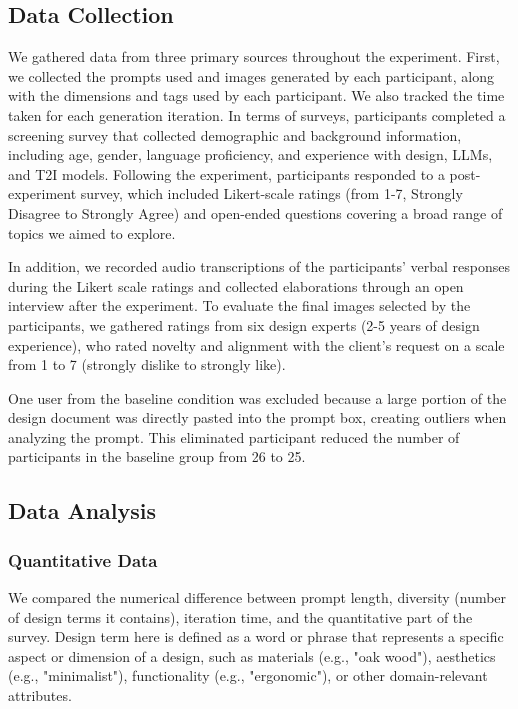\subsection{Data Collection}
We gathered data from three primary sources throughout the experiment. First, we collected the prompts used and images generated by each participant, along with the dimensions and tags used by each \toolname{} participant. We also tracked the time taken for each generation iteration. In terms of surveys, participants completed a screening survey that collected demographic and background information, including age, gender, language proficiency, and experience with design, LLMs, and T2I models. Following the experiment, participants responded to a post-experiment survey, which included Likert-scale ratings (from 1-7, Strongly Disagree to Strongly Agree) and open-ended questions covering a broad range of topics we aimed to explore.

In addition, we recorded audio transcriptions of the participants' verbal responses during the Likert scale ratings and collected elaborations through an open interview after the experiment. To evaluate the final images selected by the participants, we gathered ratings from six design experts (2-5 years of design experience), who rated novelty and alignment with the client's request on a scale from 1 to 7 (strongly dislike to strongly like).

One user from the baseline condition was excluded because a large portion of the design document was directly pasted into the prompt box, creating outliers when analyzing the prompt. This eliminated participant reduced the number of participants in the baseline group from 26 to 25.

\subsection{Data Analysis}
\subsubsection{Quantitative Data}
We compared the numerical difference between prompt length, diversity (number of design terms it contains), iteration time, and the quantitative part of the survey. Design term here is defined as a word or phrase that represents a specific aspect or dimension of a design, such as materials (e.g., "oak wood"), aesthetics (e.g., "minimalist"), functionality (e.g., "ergonomic"), or other domain-relevant attributes.


